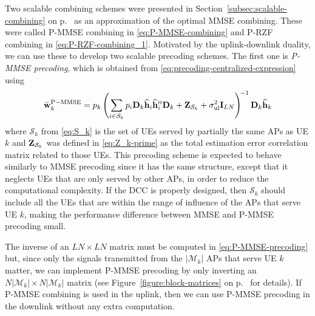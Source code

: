 Two scalable combining schemes 
 were presented in Section~\ref{subsec:scalable-combining} on p.~\pageref{subsec:scalable-combining} as an approximation of the optimal MMSE combining. These were called P-MMSE combining in \eqref{eq:P-MMSE-combining} and P-RZF combining in \eqref{eq:P-RZF-combining_1}. Motivated by the uplink-downlink duality, we can use these to develop two scalable precoding schemes.
The first one is \emph{P-MMSE precoding}, which is obtained from \eqref{eq:precoding-centralized-expression} using
\begin{equation} \label{eq:P-MMSE-precoding}
\bar{\vect{w}}_k^{{\rm P-MMSE}} =    p_k\left(\sum\limits_{i \in \mathcal {S}_k} p_{i}  \vect{D}_{k}\widehat{\vect{h}}_{i} \widehat{\vect{h}}_{i}^{\Htran}\vect{D}_{k} + {\bf{Z}}_{{\mathcal S}_k} + \sigmaUL  \vect{I}_{LN} \right)^{\!-1} \vect{{D}}_{k}\widehat{{\bf h}}_k
\end{equation}
where $\mathcal{S}_k$ from \eqref{eq:S_k} is the set of UEs served by partially the same APs as UE $k$ and ${\bf{Z}}_{{\mathcal S}_k} $ was defined in \eqref{eq:Z_k-prime} as the total estimation error correlation matrix related to those UEs. 
This precoding scheme is expected to behave similarly to MMSE precoding since it has the same structure, except that it neglects UEs that are only served by other APs, in order to reduce the computational complexity. If the DCC is properly designed, then $\mathcal{S}_k$ should include all the UEs that are within the range of influence of the APs that serve UE $k$, making the performance difference between MMSE and P-MMSE precoding small.

The inverse of an $LN \times LN$ matrix must be computed in \eqref{eq:P-MMSE-precoding} but, since only the signals transmitted from the $|\mathcal{M}_k|$ APs that serve UE $k$ matter, we can implement P-MMSE precoding by only inverting an $N |\mathcal{M}_k| \times N |\mathcal{M}_k|$ matrix (see Figure~\ref{figure:block-matrices} on p.~\pageref{figure:block-matrices} for details). If P-MMSE combining is used in the uplink, then we can use P-MMSE precoding in the downlink without  any extra computation.

